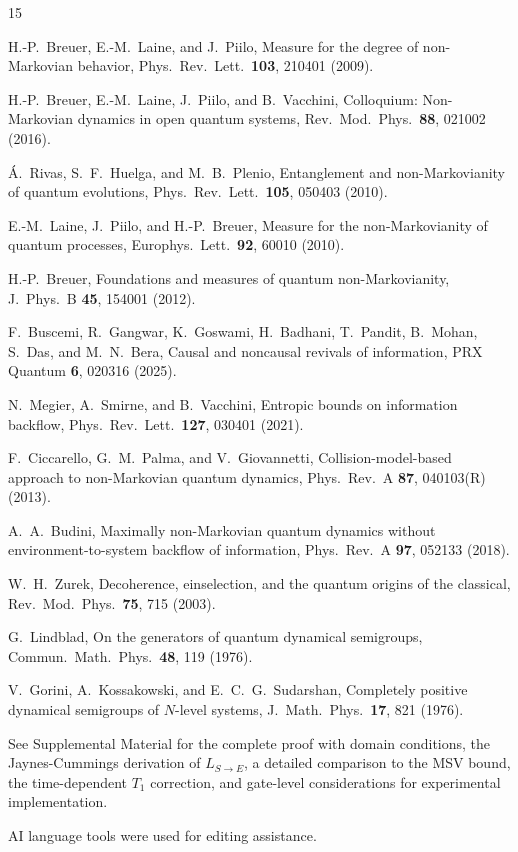 \documentclass[aps,pra,twocolumn,superscriptaddress,floatfix]{revtex4-2}
\begin{document}
\begin{thebibliography}{15}

H.-P.~Breuer, E.-M.~Laine, and J.~Piilo,
Measure for the degree of non-Markovian behavior,
Phys.\ Rev.\ Lett.\ \textbf{103}, 210401 (2009).

H.-P.~Breuer, E.-M.~Laine, J.~Piilo, and B.~Vacchini,
Colloquium: Non-Markovian dynamics in open quantum systems,
Rev.\ Mod.\ Phys.\ \textbf{88}, 021002 (2016).

\'A.~Rivas, S.~F.~Huelga, and M.~B.~Plenio,
Entanglement and non-Markovianity of quantum evolutions,
Phys.\ Rev.\ Lett.\ \textbf{105}, 050403 (2010).

E.-M.~Laine, J.~Piilo, and H.-P.~Breuer,
Measure for the non-Markovianity of quantum processes,
Europhys.\ Lett.\ \textbf{92}, 60010 (2010).

H.-P.~Breuer,
Foundations and measures of quantum non-Markovianity,
J.\ Phys.\ B \textbf{45}, 154001 (2012).

F.~Buscemi, R.~Gangwar, K.~Goswami, H.~Badhani, T.~Pandit, B.~Mohan, S.~Das, and M.~N.~Bera,
Causal and noncausal revivals of information,
PRX Quantum \textbf{6}, 020316 (2025).

N.~Megier, A.~Smirne, and B.~Vacchini,
Entropic bounds on information backflow,
Phys.\ Rev.\ Lett.\ \textbf{127}, 030401 (2021).

F.~Ciccarello, G.~M.~Palma, and V.~Giovannetti,
Collision-model-based approach to non-Markovian quantum dynamics,
Phys.\ Rev.\ A \textbf{87}, 040103(R) (2013).

A.~A.~Budini,
Maximally non-Markovian quantum dynamics without environment-to-system backflow of information,
Phys.\ Rev.\ A \textbf{97}, 052133 (2018).

W.~H.~Zurek,
Decoherence, einselection, and the quantum origins of the classical,
Rev.\ Mod.\ Phys.\ \textbf{75}, 715 (2003).

G.~Lindblad,
On the generators of quantum dynamical semigroups,
Commun.\ Math.\ Phys.\ \textbf{48}, 119 (1976).

V.~Gorini, A.~Kossakowski, and E.~C.~G.~Sudarshan,
Completely positive dynamical semigroups of $N$-level systems,
J.\ Math.\ Phys.\ \textbf{17}, 821 (1976).

See Supplemental Material for the complete proof with domain conditions, the Jaynes-Cummings derivation of $L_{S\to E}$, a detailed comparison to the MSV bound, the time-dependent $T_1$ correction, and gate-level considerations for experimental implementation.

\end{thebibliography}

\acknowledgments
AI language tools were used for editing assistance.
\end{document}
